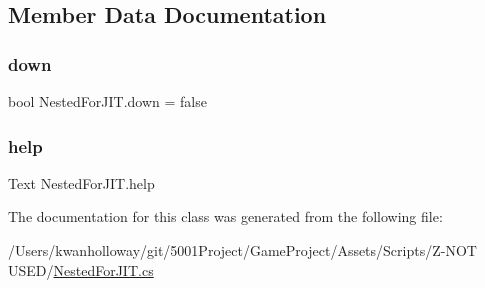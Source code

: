 \subsection{Member Data Documentation}
\mbox{\label{class_nested_for_j_i_t_ad2b53657e8277ec61faf775924102a7e}} 
\subsubsection{\texorpdfstring{down}{down}}
{\footnotesize\ttfamily bool Nested\+For\+J\+I\+T.\+down = false}

\mbox{\label{class_nested_for_j_i_t_ad3d5a4ec0034f914c533ba9da9614ce5}} 
\subsubsection{\texorpdfstring{help}{help}}
{\footnotesize\ttfamily Text Nested\+For\+J\+I\+T.\+help}



The documentation for this class was generated from the following file\+:\begin{DoxyCompactItemize}
\item 
/\+Users/kwanholloway/git/5001\+Project/\+Game\+Project/\+Assets/\+Scripts/\+Z-\/\+N\+O\+T U\+S\+E\+D/\hyperlink{_nested_for_j_i_t_8cs}{Nested\+For\+J\+I\+T.\+cs}\end{DoxyCompactItemize}
